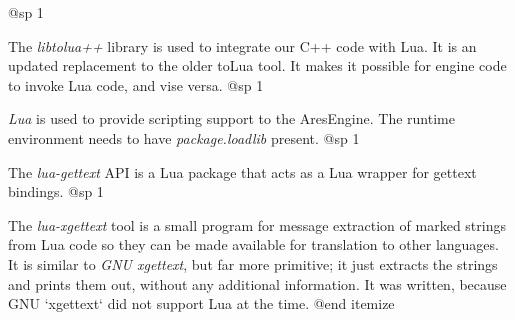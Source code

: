 @sp 1

\itemize

\item
The {\it libtolua++} library is used to integrate our C++ code with Lua. It is an updated replacement to the older toLua tool. It makes it possible for engine code to invoke Lua code, and vise versa.
@sp 1

\item
{\it Lua} is used to provide scripting support to the AresEngine. The runtime environment needs to have {\it package.loadlib} present.
@sp 1

\item
The {\it lua-gettext} API is a Lua package that acts as a Lua wrapper for gettext bindings.
@sp 1

\item
The {\it lua-xgettext} tool is a small program for message extraction of marked strings from Lua code so they can be made available for translation to other languages. It is similar to {\it GNU xgettext}, but far more primitive; it just extracts the strings and prints them out, without any additional information. It was written, because GNU `xgettext` did not support Lua at the time.
@end itemize


